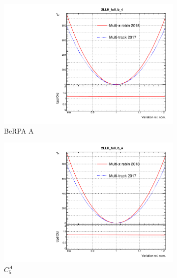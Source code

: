 \begin{figure}[h]
	\begin{subfigure}[t]{0.32\textwidth}
		\includegraphics[width=\textwidth,page=18, trim={0mm 0mm 0mm 9mm}, clip]{figures/mach3/2018/llh/MultiPi_vs_MultiTrack_TotalLLH_2017vs2018}
		\caption{BeRPA A}
	\end{subfigure}
	\begin{subfigure}[t]{0.32\textwidth}
		\includegraphics[width=\textwidth,page=23, trim={0mm 0mm 0mm 9mm}, clip]{figures/mach3/2018/llh/MultiPi_vs_MultiTrack_TotalLLH_2017vs2018}
		\caption{$C_5^A$}
	\end{subfigure}
	\begin{subfigure}[t]{0.32\textwidth}

\end{subfigure}
\end{figure}
